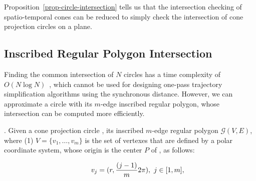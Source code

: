 

Proposition~\ref{prop-circle-intersection} tells us that the intersection checking of  spatio-temporal cones can be reduced to simply check the intersection of cone projection circles on a plane.


\subsection{Inscribed Regular Polygon Intersection}
\label{subsec-RPI}

Finding the common intersection of $N$ circles has a time complexity of ${O(N\log N)}$~\cite{Shamos:Circle}, which cannot be used
for designing one-pass trajectory simplification algorithms using the synchronous distance.
%
However, we can approximate a circle with its $m$-edge inscribed regular polygon, whose intersection can be computed more efficiently.




.
Given a cone projection circle , its inscribed $m$-edge regular polygon $\mathcal{G}(V, E)$,
where (1) $V=\{v_1, \ldots, v_{m}\}$ is the set of vertexes that are defined by a polar coordinate system, whose origin is the center $P$ of \pcircle{}, as follows:


\vspace{-1ex}
\begin{equation*}
\label{equ-regular-polygon}
    \begin{aligned}
        \hspace{5ex}  v_j = (r, \frac{(j-1)}{m}2\pi), ~j \in [1, m], \\
    \end{aligned}
\end{equation*}
\vspace{-1ex}

